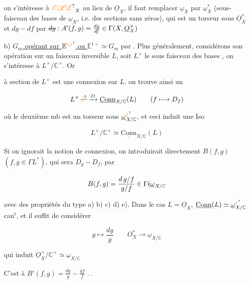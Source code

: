 

 on s'intéresse à $\unsure{\mathscr E|\mathscr L|\mathcal E}_X$ au lieu de $\underline O_X$, il faut remplacer $\underline\omega_X$ par $\underline\omega_X^*$ (sous-faisceau des bases de $\underline\omega_X$, i.e. des sections sans zéros), qui est un torseur sous $\underline O_X^*$ et $dg-df$ par $\deleted{dg}\mathrel{:} A'(f,g)=\frac{dg}{df}\in\Gamma(X,\underline O_X^{\times})$

b) \uline{$G_m$ opérant sur $\mathbb E^{\unsure{1|\prime}}$ ou $\mathbb E^{1\times}\simeq G_m$} par . Plus généralement, considérons son opération sur un faisceau inversible $L$, soit $L^{\times}$ le sous faisceau des bases , on s'intéresse à $L^{\times}/\mathbb C^{\times}$. Or

à  section de $L^{\times}$ est  une connexion sur $L$. on trouve ainsi un 

\[
 L^{\times}\,\deleted{\unsure{/}}\xrightarrow{D}\underline{\mathrm{Conn}}_{X/\mathbb C}(L)\qquad(f\longmapsto D_f)
\]

où le deuxième mb est un torseur sous $\underline\omega_{X/\mathbb C}^{\unsure{1}}$, et ceci induit une  Iso

\[
 L^{\times}/\mathbb C^{\times}\simeq\underline{\mathrm{Conn}}_{X/\mathbb C}(L)
\]

Si on ignorait la notion de connexion, on introduirait directement $B(f,g)$ $(f,g\in\Gamma L^*)$, qui sera  $D_g-D_f$, par

\[
 B(f,g)=\frac{d\,g/f}{g/f}\in\Gamma\deleted{(}\underline\omega_{X/\mathbb C}
\]

avec des propriétés du type a) b) c) d) e). Dans le cas $L=\underline O_X$, $\underline{\mathrm{Conn}}(L)\simeq\underline\omega^{\unsure{1}}_{X/\mathbb C}$ can$^{\mathrm{t}}$, et il suffit de considérer

\[
 g\longmapsto\frac{dg}{g}\qquad O_X^*\longrightarrow\underline\omega_{X/\mathbb C}
\]

qui induit $\underline O_{X}^{\times}/\mathbb C^{\times}\simeq\underline\omega_{X/\mathbb C}$


C'est  à $B'(f,g)=\frac{dg}{g}-\frac{df}{f}$ .\,.

